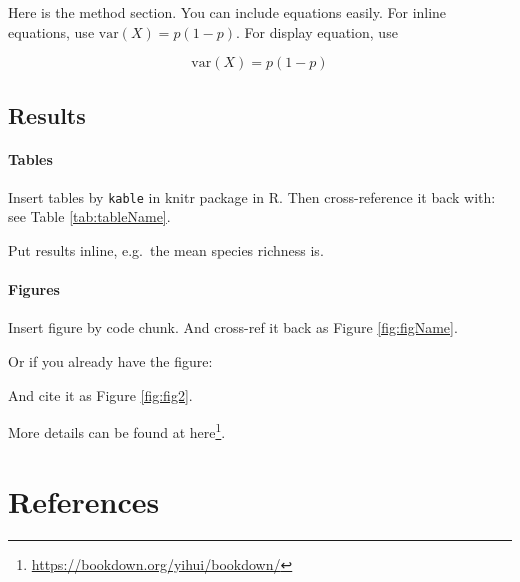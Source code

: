 \documentclass[
  12pt,
]{article}
\DeclareRobustCommand{\href}[2]{#2\footnote{\url{#1}}}
\begin{document}
Here is the method section. You can include equations easily. For inline equations, use \(\text{var}(X) = p(1-p)\). For display equation, use

\[\text{var}(X) = p(1-p)\]

\hypertarget{results}{%
\subsection{Results}\label{results}}

\hypertarget{tables}{%
\paragraph{Tables}\label{tables}}

Insert tables by \texttt{kable} in knitr package in R. Then cross-reference it back with: see Table \ref{tab:tableName}.



Put results inline, e.g.~the mean species richness is.

\hypertarget{figures}{%
\paragraph{Figures}\label{figures}}

Insert figure by code chunk. And cross-ref it back as Figure \ref{fig:figName}.



Or if you already have the figure:

And cite it as Figure \ref{fig:fig2}.



More details can be found at \href{https://bookdown.org/yihui/bookdown/}{here}.

\hypertarget{references}{%
\section{References}\label{references}}
\end{document}
